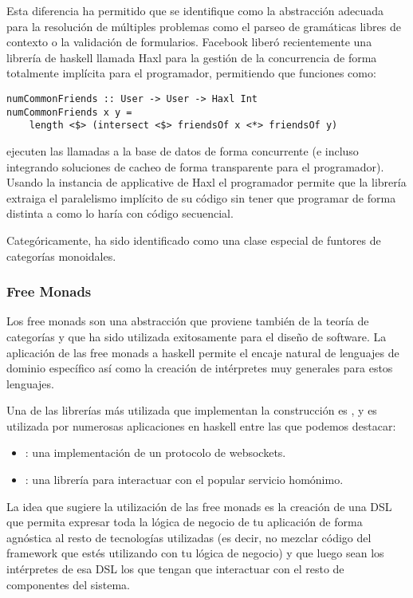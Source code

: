Esta diferencia ha permitido que  se identifique
como la abstracción adecuada
para la resolución de múltiples problemas como el parseo de gramáticas libres de
contexto o la validación de formularios. Facebook liberó
recientemente
una librería de haskell llamada Haxl para la gestión
de la concurrencia de
forma totalmente implícita para el programador, permitiendo
que funciones como:
\begin{verbatim}
numCommonFriends :: User -> User -> Haxl Int
numCommonFriends x y =
    length <$> (intersect <$> friendsOf x <*> friendsOf y)
\end{verbatim}
ejecuten las llamadas  a la base de datos de forma
concurrente (e incluso integrando soluciones de cacheo de forma
transparente para el programador). Usando la instancia de
applicative de Haxl el programador permite que la librería
extraiga el paralelismo implícito de su código sin tener que programar
de forma distinta a como lo haría con código secuencial.

Categóricamente,  ha sido identificado como una
clase especial de funtores de categorías monoidales.

\subsubsection{Free Monads}
Los free monads son una abstracción que proviene también de la
teoría de categorías y que ha sido utilizada exitosamente para el
diseño de software. La aplicación de las free monads a haskell
permite el encaje natural de lenguajes de dominio específico así
como la creación de intérpretes muy generales para estos lenguajes.

Una de las librerías más utilizada que implementan la construcción
es , y es utilizada por numerosas aplicaciones en haskell
entre las que podemos destacar:
\begin{itemize}
\item {}: una implementación de un protocolo de
  websockets.
\item {}: una librería para interactuar con el popular
  servicio homónimo.
\end{itemize}

La idea que sugiere la utilización de las free monads es la
creación de una DSL que permita expresar toda la lógica de negocio
de tu aplicación de forma agnóstica al resto de tecnologías
utilizadas (es decir, no mezclar código del framework que estés
utilizando con tu lógica de negocio) y que luego sean los intérpretes
de esa DSL los que tengan que interactuar con el resto de componentes
del sistema.
